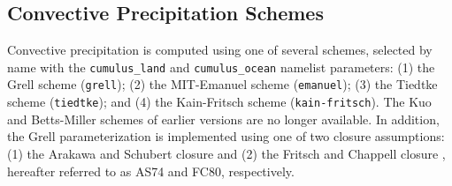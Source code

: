\subsection{Convective Precipitation Schemes}

Convective precipitation is computed using one of several schemes, selected
by name with the \texttt{cumulus\_land} and \texttt{cumulus\_ocean} namelist
parameters: (1) the Grell scheme \cite{Grell_93} (\texttt{grell}); (2) the
MIT-Emanuel scheme \citep{Emanuel_91,Emanuel_99} (\texttt{emanuel}); (3) the
Tiedtke scheme \citep{Tiedtke_89} (\texttt{tiedtke}); and (4) the
Kain-Fritsch scheme \citep{Kain_93,Kain_04} (\texttt{kain-fritsch}). The
Kuo and Betts-Miller schemes of earlier versions are no longer available.
In addition, the Grell parameterization is
implemented using one of two closure assumptions: (1) the Arakawa and Schubert
closure \cite{Grell_94} and (2) the Fritsch and Chappell closure
\cite{Fritsch_80}, hereafter referred to as AS74 and FC80, respectively.\\

